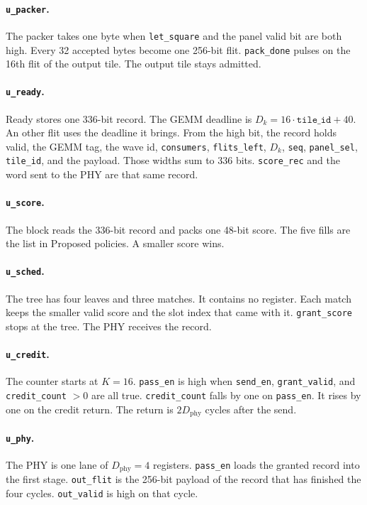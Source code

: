 \documentclass[11pt,a4paper]{article}
\begin{document}
\paragraph{\texttt{u\_packer}.}
The packer takes one byte when \texttt{let\_square} and the panel valid bit are both high.
Every 32 accepted bytes become one 256-bit flit.
\texttt{pack\_done} pulses on the 16th flit of the output tile.
The output tile stays admitted.
\figpacker

\paragraph{\texttt{u\_ready}.}
Ready stores one 336-bit record.
The GEMM deadline is $D_k = 16\cdot\texttt{tile\_id} + 40$.
An other flit uses the deadline it brings.
From the high bit, the record holds valid, the GEMM tag, the wave id, \texttt{consumers}, \texttt{flits\_left}, $D_k$, \texttt{seq}, \texttt{panel\_sel}, \texttt{tile\_id}, and the payload.
Those widths sum to 336 bits.
\texttt{score\_rec} and the word sent to the PHY are that same record.
\figready

\paragraph{\texttt{u\_score}.}
The block reads the 336-bit record and packs one 48-bit score.
The five fills are the list in Proposed policies.
A smaller score wins.

\paragraph{\texttt{u\_sched}.}
The tree has four leaves and three matches.
It contains no register.
Each match keeps the smaller valid score and the slot index that came with it.
\texttt{grant\_score} stops at the tree.
The PHY receives the record.
\figsched

\paragraph{\texttt{u\_credit}.}
The counter starts at $K = 16$.
\texttt{pass\_en} is high when \texttt{send\_en}, \texttt{grant\_valid}, and \texttt{credit\_count} $> 0$ are all true.
\texttt{credit\_count} falls by one on \texttt{pass\_en}.
It rises by one on the credit return.
The return is $2 D_{\mathrm{phy}}$ cycles after the send.
\figcredit

\paragraph{\texttt{u\_phy}.}
The PHY is one lane of $D_{\mathrm{phy}} = 4$ registers.
\texttt{pass\_en} loads the granted record into the first stage.
\texttt{out\_flit} is the 256-bit payload of the record that has finished the four cycles.
\texttt{out\_valid} is high on that cycle.
\figphy
\end{document}
